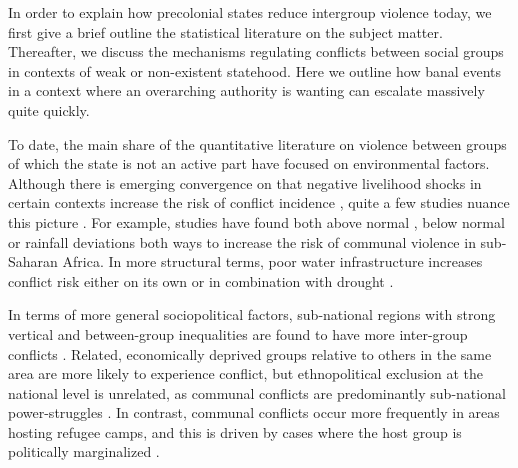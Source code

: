 In order to explain how precolonial states reduce intergroup violence today, we
first give a brief outline the statistical literature on the subject matter.
Thereafter, we discuss the mechanisms regulating conflicts between social groups
in contexts of weak or non-existent statehood. Here we outline how banal events
in a context where an overarching authority is wanting can escalate massively
quite quickly. 

To date, the main share of the quantitative literature on violence between
groups of which the state is not an active part have focused on environmental
factors. Although there is emerging convergence on that negative livelihood
shocks in certain contexts increase the risk of conflict incidence
\citep{Fjelde2012, van_Weezel_2019, Petrova_2022}, quite a few studies nuance this
picture \cite[see][for a review]{Theisen_2017}. For example, studies have found
both above normal \cite[see for instance][]{Theisen2012, Witsenburg2012}, below
normal \citep{Fjelde2012} or rainfall deviations both ways
\citep{Nordkvelle_2017, Raleigh_2012} to increase the risk of communal violence
in sub-Saharan Africa. In more structural terms, poor water infrastructure
increases conflict risk either on its own or in combination with drought
\citep{Detges_2017, D_ring_2020}. 

In terms of more general sociopolitical factors, sub-national regions with
strong vertical and between-group inequalities are found to have more
inter-group conflicts \citep{Fjelde2014}. Related, economically deprived groups
relative to others in the same area are more likely to experience conflict, but
ethnopolitical exclusion at the national level is unrelated, as communal
conflicts are predominantly sub-national power-struggles \citep{Hillesund_2017}.
In contrast, communal conflicts occur more frequently in areas hosting refugee
camps, and this is driven by cases where the host group is politically
marginalized \citep{Fisk_2019}. 

